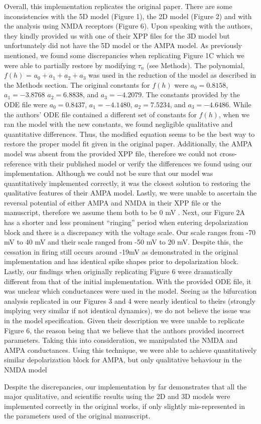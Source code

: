 Overall, this implementation replicates the original paper. There are some inconsistencies with the 5D model (Figure 1), the 2D model (Figure 2) and with the analysis using NMDA receptors (Figure 6). Upon speaking with the authors, they kindly provided us with one of their XPP files for the 3D model but unfortunately did not have the 5D model or the AMPA model. As previously mentioned, we found some discrepancies when replicating Figure 1C which we were able to partially restore by modifying $\tau_n$ (see Methods). The polynomial, $f(h)$ = $a_0 + a_1 + a_2 + a_3$ was used in the reduction of the model as described in the Methods section.  The original constants for $f(h)$ were $a_0 =0.8158$, $a_1= −3.8768$ $a_2 = 6.8838$, and $a_3 = −4.2079$. The constants provided by the ODE file were $a_0 = 0.8437$, $a_1 = -4.1480$, $a_2 = 7.5234$, and $a_3 = -4.6486$. While the authors’ ODE file contained a different set of constants for $f(h)$, when we ran the model with the new constants, we found negligible qualitative and quantitative differences. Thus, the modified equation seems to be the best way to restore the proper model fit given in the original paper. Additionally, the AMPA model was absent from the provided XPP file, therefore we could not cross-reference with their published model or verify the differences we found using our implementation. Although we could not be sure that our model was quantitatively implemented correctly, it was the closest solution to restoring the qualitative features of their AMPA model. Lastly, we were unable to ascertain the reversal potential of either AMPA and NMDA in their XPP file or the manuscript, therefore we assume them both to be 0 mV \cite{neuroscience_2001}. Next, our Figure 2A has a shorter and less prominent ``ringing'' period when entering depolarization block and there is a discrepancy with the voltage scale. Our scale ranges from -70 mV to 40 mV and their scale ranged from -50 mV to 20 mV.  Despite this, the cessation in firing still occurs around -19mV as demonstrated in the original implementation and has identical spike shapes prior to depolarization block. Lastly, our findings when originally replicating Figure 6 were dramatically different from that of the initial implementation. With the provided ODE file, it was unclear which conductances were used in the model. Seeing as the bifurcation analysis replicated in our Figures 3 and 4 were nearly identical to theirs (strongly implying very similar if not identical dynamics), we do not believe the issue was in the model specification. Given their description we were unable to replicate Figure 6, the reason being that we believe that the authors provided incorrect parameters. Taking this into consideration, we manipulated the NMDA and AMPA conductances. Using this technique, we were able to achieve quantitatively similar depolarization block for AMPA, but only qualitative behaviour in the NMDA model

Despite the discrepancies, our implementation by far demonstrates that all the major qualitative, and scientific results using the 2D and 3D models were implemented correctly in the original works, if only slightly mis-represented in the parameters used of the original manuscript.
